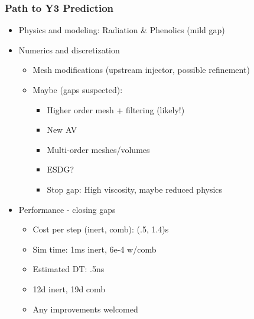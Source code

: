 \begin{frame}\frametitle{Path to Y3 Prediction}
\begin{multicols}{2}
\begin{itemize}
\item Physics and modeling: Radiation \& Phenolics (mild gap)
\item Numerics and discretization
  \begin{itemize}
  \item Mesh modifications (upstream injector, possible refinement)
  \item Maybe (gaps suspected):
    \begin{itemize}
    \item Higher order mesh + filtering (likely!)
    \item New AV
    \item Multi-order meshes/volumes
    \item ESDG? 
    \item Stop gap: High viscosity, maybe reduced physics
    \end{itemize}
  \end{itemize}
\columnbreak
\item Performance - closing gaps
  \begin{itemize}
  \item Cost per step (inert, comb): (.5, 1.4)s
  \item Sim time: 1ms inert, 6e-4 w/comb
  \item Estimated DT: .5ns
  \item 12d inert, 19d comb
  \item Any improvements welcomed
  \end{itemize}
\end{itemize}
\end{multicols}
\end{frame}

